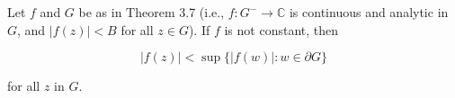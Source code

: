 Let $f$ and $G$ be as in Theorem 3.7 (i.e., $f: G^- \to \mathbb{C}$ is continuous and analytic in $G$, and $|f(z)| < B$ for all $z \in G$). If $f$ is not constant, then

$$|f(z)| < \sup \{ |f(w)| : w \in \partial G \}$$

for all $z$ in $G$.
